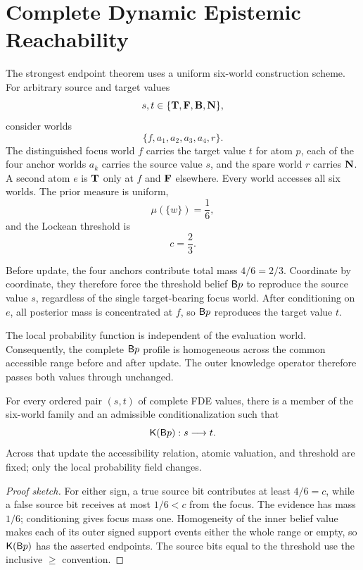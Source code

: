 \section{Complete Dynamic Epistemic Reachability}
\label{sec:reachability}

The strongest endpoint theorem uses a uniform six-world construction scheme. For arbitrary source and target values
\[
  s,t\in\{\mathbf{T},\mathbf{F},\mathbf{B},\mathbf{N}\},
\]
consider worlds
\[
  \{f,a_1,a_2,a_3,a_4,r\}.
\]
The distinguished focus world \(f\) carries the target value \(t\) for atom \(p\), each of the four anchor worlds \(a_k\) carries the source value \(s\), and the spare world \(r\) carries \(\mathbf{N}\). A second atom \(e\) is \(\mathbf{T}\) only at \(f\) and \(\mathbf{F}\) elsewhere. Every world accesses all six worlds. The prior measure is uniform,
\[
  \mu(\{w\})=\frac16,
\]
and the Lockean threshold is
\[
  c=\frac23.
\]

Before update, the four anchors contribute total mass \(4/6=2/3\). Coordinate by coordinate, they therefore force the threshold belief \(\mathsf{B} p\) to reproduce the source value \(s\), regardless of the single target-bearing focus world. After conditioning on \(e\), all posterior mass is concentrated at \(f\), so \(\mathsf{B} p\) reproduces the target value \(t\).

The local probability function is independent of the evaluation world. Consequently, the complete \(\mathsf{B} p\) profile is homogeneous across the common accessible range before and after update. The outer knowledge operator therefore passes both values through unchanged.

\begin{theorem}
For every ordered pair \((s,t)\) of complete FDE values, there is a member of the six-world family and an admissible conditionalization such that
\[
  \mathsf{K}(\mathsf{B} p):s\longrightarrow t.
\]
Across that update the accessibility relation, atomic valuation, and threshold are fixed; only the local probability field changes.
\statuswitness
\end{theorem}

\begin{proof}[Proof sketch]
For either sign, a true source bit contributes at least \(4/6=c\), while a false source bit receives at most \(1/6<c\) from the focus. The evidence has mass \(1/6\); conditioning gives focus mass one. Homogeneity of the inner belief value makes each of its outer signed support events either the whole range or empty, so \(\mathsf{K}(\mathsf{B} p)\) has the asserted endpoints. The source bits equal to the threshold use the inclusive \(\ge\) convention.
\end{proof}


